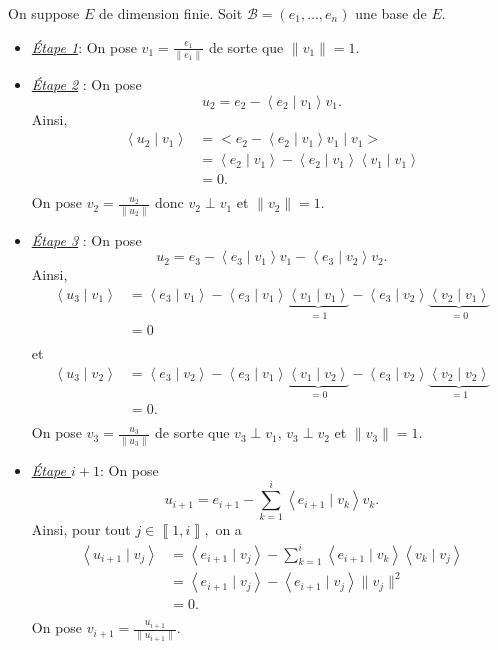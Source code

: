 \begin{algo}
	On suppose $E$ de dimension finie. Soit $\mathcal{B} = (e_1, \ldots, e_n)$ une base de $E$.

	\begin{itemize}
		\item\underline{\it Étape 1}: On pose $v_1 = \frac{e_1}{\|e_1\|}$ de sorte que $\|v_1\| = 1$.
		\item\underline{\it Étape 2} : On pose \[
				u_2 = e_2 - \left<e_2  \mid v_1 \right> v_1
			.\] Ainsi,
			\begin{align*}
				\left<u_2 \mid v_1 \right> &= \big<e_2 - \left<e_2 \mid v_1 \right> v_1  \mid v_1 \big>\\
				&= \left<e_2 \mid v_1 \right> - \left<e_2 \mid v_1 \right> \left<v_1 \mid v_1 \right> \\
				&= 0. \\
			\end{align*}
			On pose $v_2 = \frac{u_2}{\|u_2\|}$ donc $v_2 \perp v_1$ et $\|v_2\| = 1$.
		\item\underline{\it Étape 3} : On pose \[
				u_2 = e_3 - \left<e_3 \mid v_1 \right>v_1 - \left<e_3 \mid v_2 \right>v_2
			.\] Ainsi,
			\begin{align*}
				\left<u_3  \mid v_1 \right> &= \left<e_3  \mid v_1 \right> - \left<e_3 \mid v_1 \right>\underbrace{\left<v_1 \mid v_1 \right>}_{=1} - \left<e_3 \mid v_2 \right>\underbrace{\left<v_2 \mid v_1 \right>}_{=0} \\
				&= 0 \\
			\end{align*}
			et 
			\begin{align*}
				\left<u_3 \mid v_2 \right> &= \left<e_3  \mid  v_2 \right> - \left<e_3 \mid v_1 \right> \underbrace{\left<v_1 \mid v_2 \right>}_{=0} - \left<e_3 \mid v_2 \right> \underbrace{\left<v_2 \mid v_2 \right>}_{=1}\\
				&= 0. \\
			\end{align*}
			On pose $v_3 = \frac{u_3}{\|u_3\|}$ de sorte que $v_3 \perp v_1$, $v_3 \perp v_2$ et $\|v_3\| = 1$.
		\item\underline{\it Étape $i+1$}: On pose \[
			u_{i+1} = e_{i+1} - \sum_{k=1}^i \left<e_{i+1}  \mid v_k \right> v_k
		.\] Ainsi, pour tout $j \in \left\llbracket 1,i \right\rrbracket,$ on a
		\begin{align*}
			\left<u_{i+1}  \mid v_j \right> &= \left<e_{i+1}  \mid v_j \right> - \sum_{k=1}^i \left<e_{i+1} \mid v_k \right> \left<v_k \mid v_j \right> \\
			&= \left<e_{i+1} \mid v_j \right> - \left<e_{i+1} \mid v_j \right> \|v_j\|^2 \\
			&= 0. \\
		\end{align*}
		On pose $v_{i+1} = \frac{u_{i+1}}{\|u_{i+1}\|}$.
	\end{itemize}
\end{algo}

